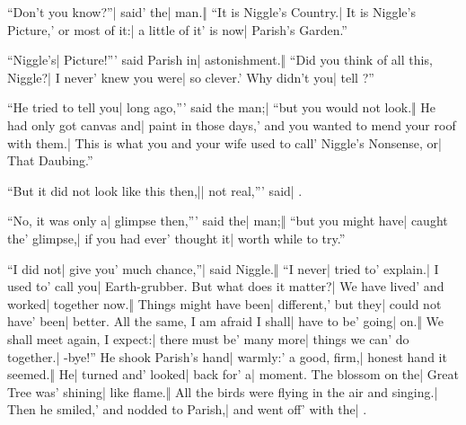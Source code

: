 \begin{itemize}
\halfone “Don’t you know?”| said' the| man.‖ “It is Niggle’s Country.| It is Niggle’s Picture,' or most of it:| a little of it' is now| Parish’s Garden.”
\end{itemize}

\begin{itemize}
\halftwo “Niggle’s| Picture!”' said Parish in| astonishment.‖ “Did you think of all this, Niggle?| I never' knew you were| so clever.' Why didn’t you| tell ?”
\end{itemize}

\begin{itemize}
\halfone “He tried to tell you| long ago,”' said the man;| “but you would not look.‖ He had only got canvas and| paint in those days,' and you wanted to mend your roof with them.| This is what you and your wife used to call' Niggle’s Nonsense, or| That Daubing.”
\end{itemize}

\begin{itemize}
\quarterfour “But it did not look like this then,|| not real,”' said| .
\end{itemize}


\begin{itemize}
\halfone “No, it was only a| glimpse then,”' said the| man;‖ “but you might have| caught the' glimpse,| if you had ever' thought it| worth while to try.”
\end{itemize}

\begin{itemize}
\halftwo “I did not| give you' much chance,”| said Niggle.‖ “I never| tried to' explain.| I used to' call you|  Earth-grubber.
\halfone {}But what does it matter?| We have lived' and worked| together now.‖ Things might have been| different,' but they| could not have' been| better.
\halftwo {}All the same, I am afraid I shall| have to be' going| on.‖ We shall meet again, I expect:| there must be' many more| things we can' do together.| -bye!”
\halfone He shook Parish’s hand| warmly:' a good, firm,| honest hand it seemed.‖ He| turned and' looked| back for' a| moment.
\halftwo The blossom on the| Great Tree was' shining| like flame.‖ All the birds were flying in the air and singing.| Then he smiled,' and nodded to Parish,| and went off' with the| .
\end{itemize}

